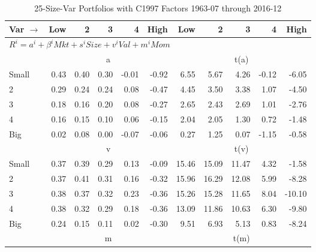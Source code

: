 
\begin{table}[!ht]
\footnotesize
\centering
\caption{25-Size-Var Portfolios with C1997 Factors 1963-07 through 2016-12}
\begin{tabular}{lrrrrrrrrrr}
  \toprule
    Var $\rightarrow$ & Low & 2 & 3 & 4 & High & Low & 2 & 3 & 4 & High \\ 
  \midrule
  \multicolumn{11}{l}{$R^i=a^i+\beta^iMkt+s^iSize+v^iVal+m^iMom$} \\

  
    
      & \multicolumn{5}{c}{a} & \multicolumn{5}{c}{t(a)}
    
    \\
      \cmidrule(r){2-6} \cmidrule(r){7-11}

    Small   & 0.43  & 0.40  & 0.30  & -0.01  & -0.92  & 6.55  & 5.67  & 4.26  & -0.12  & -6.05  \\
         2  & 0.29  & 0.24  & 0.24  & 0.08  & -0.47  & 4.45  & 3.50  & 3.38  & 1.07  & -4.50  \\
         3  & 0.18  & 0.16  & 0.20  & 0.08  & -0.27  & 2.65  & 2.43  & 2.69  & 1.01  & -2.76  \\
         4  & 0.16  & 0.15  & 0.10  & 0.06  & -0.15  & 2.04  & 2.05  & 1.30  & 0.72  & -1.48  \\
    Big     & 0.02  & 0.08  & 0.00  & -0.07  & -0.06  & 0.27  & 1.25  & 0.07  & -1.15  & -0.58  \\

  
    
      & \multicolumn{5}{c}{v} & \multicolumn{5}{c}{t(v)}
    
    \\
      \cmidrule(r){2-6} \cmidrule(r){7-11}

    Small   & 0.37  & 0.39  & 0.29  & 0.13  & -0.09  & 15.46  & 15.09  & 11.47  & 4.32  & -1.58  \\
         2  & 0.37  & 0.41  & 0.31  & 0.16  & -0.32  & 15.96  & 16.29  & 12.08  & 5.99  & -8.28  \\
         3  & 0.38  & 0.37  & 0.32  & 0.23  & -0.36  & 15.26  & 15.28  & 11.65  & 8.04  & -10.10  \\
         4  & 0.38  & 0.32  & 0.29  & 0.18  & -0.36  & 13.09  & 11.86  & 10.63  & 6.30  & -9.80  \\
    Big     & 0.24  & 0.15  & 0.11  & 0.02  & -0.30  & 9.51  & 6.93  & 5.13  & 0.83  & -8.24  \\

  
    
      & \multicolumn{5}{c}{m} & \multicolumn{5}{c}{t(m)}
    

\end{tabular}
\end{table}
